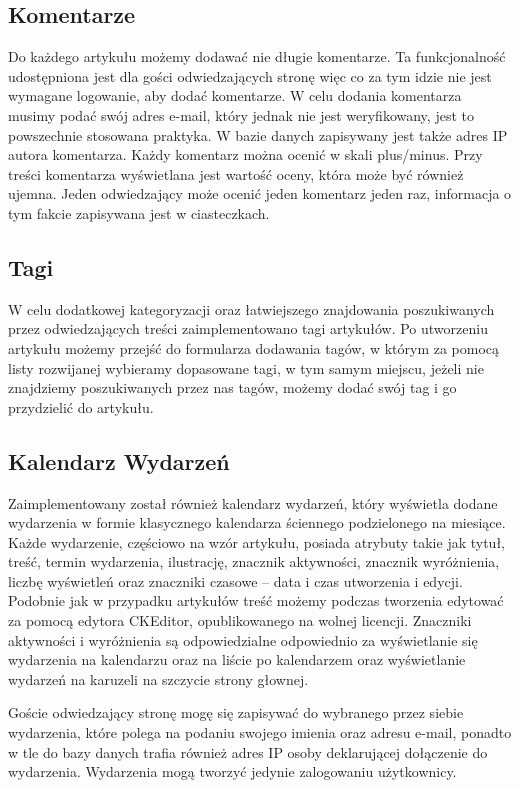 \documentclass[openright]{xmgr}
\begin{document}
\subsection{Komentarze}
Do każdego artykułu możemy dodawać nie długie komentarze. Ta funkcjonalność udostępniona jest dla gości odwiedzających stronę więc co za tym idzie nie jest wymagane logowanie, aby dodać komentarze. W celu dodania komentarza musimy podać swój adres e-mail, który jednak nie jest weryfikowany, jest to powszechnie stosowana praktyka. W bazie danych zapisywany jest także adres IP autora komentarza. Każdy komentarz można ocenić w skali plus/minus. Przy treści komentarza wyświetlana jest wartość oceny, która może być również ujemna. Jeden odwiedzający może ocenić jeden komentarz jeden raz, informacja o tym fakcie zapisywana jest w ciasteczkach.

\newpage

\subsection{Tagi}
W celu dodatkowej kategoryzacji oraz łatwiejszego znajdowania poszukiwanych przez odwiedzających treści zaimplementowano tagi artykułów. Po utworzeniu artykułu możemy przejść do formularza dodawania tagów, w którym za pomocą listy rozwijanej wybieramy dopasowane tagi, w tym samym miejscu, jeżeli nie znajdziemy poszukiwanych przez nas tagów, możemy dodać swój tag i go przydzielić do artykułu.

\subsection{Kalendarz Wydarzeń}
Zaimplementowany został również kalendarz wydarzeń, który wyświetla dodane wydarzenia w formie klasycznego kalendarza ściennego podzielonego na miesiące. Każde wydarzenie, częściowo na wzór artykułu, posiada atrybuty takie jak tytuł, treść, termin wydarzenia, ilustrację, znacznik aktywności, znacznik wyróżnienia, liczbę wyświetleń oraz znaczniki czasowe – data i czas utworzenia i edycji. Podobnie jak w przypadku artykułów treść możemy podczas tworzenia  edytować za pomocą edytora CKEditor, opublikowanego na wolnej licencji. Znaczniki aktywności i wyróżnienia są odpowiedzialne odpowiednio za wyświetlanie się wydarzenia na kalendarzu oraz na liście po kalendarzem oraz wyświetlanie wydarzeń na karuzeli na szczycie strony głownej. 

Goście odwiedzający stronę mogę się zapisywać do wybranego przez siebie wydarzenia, które polega na podaniu swojego imienia oraz adresu e-mail, ponadto w tle do bazy danych trafia również adres IP osoby deklarującej dołączenie do wydarzenia. Wydarzenia mogą tworzyć jedynie zalogowaniu użytkownicy.
\end{document}
